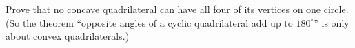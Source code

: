 Prove that no concave quadrilateral can have all four of its vertices on one circle. (So the theorem ``opposite angles of a cyclic quadrilateral add up to $180^\circ$'' is only about convex quadrilaterals.)
